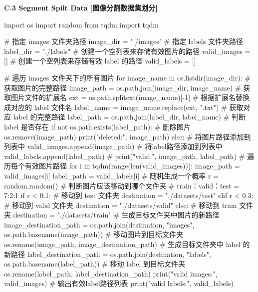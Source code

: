 \documentclass{MathorCupmodeling}
\begin{document}
\textbf{C.3 Segment Spilt Data [图像分割数据集划分]}
\begin{python}
import os
import random
from tqdm import tqdm

# 指定 images 文件夹路径
image_dir = "./images"
# 指定 labels 文件夹路径
label_dir = "./labels"
# 创建一个空列表来存储有效图片的路径
valid_images = []
# 创建一个空列表来存储有效 label 的路径
valid_labels = []

# 遍历 images 文件夹下的所有图片
for image_name in os.listdir(image_dir):
    # 获取图片的完整路径
    image_path = os.path.join(image_dir, image_name)
    # 获取图片文件的扩展名
    ext = os.path.splitext(image_name)[-1]
    # 根据扩展名替换成对应的 label 文件名
    label_name = image_name.replace(ext, ".txt")
    # 获取对应 label 的完整路径
    label_path = os.path.join(label_dir, label_name)
    # 判断 label 是否存在
    if not os.path.exists(label_path):
        # 删除图片
        os.remove(image_path)
        print("deleted:", image_path)
    else:
        # 将图片路径添加到列表中
        valid_images.append(image_path)
        # 将label路径添加到列表中
        valid_labels.append(label_path)
        # print("valid:", image_path, label_path)
# 遍历每个有效图片路径
for i in tqdm(range(len(valid_images))):
    image_path = valid_images[i]
    label_path = valid_labels[i]
    # 随机生成一个概率
    r = random.random()
    # 判断图片应该移动到哪个文件夹
    # train：valid：test = 7:2:1
    if r < 0.1:
        # 移动到 test 文件夹
        destination = "./datasets/test"
    elif r < 0.3:
        # 移动到 valid 文件夹
        destination = "./datasets/valid"
    else:
        # 移动到 train 文件夹
        destination = "./datasets/train"
    # 生成目标文件夹中图片的新路径
    image_destination_path = os.path.join(destination, "images", os.path.basename(image_path))
    # 移动图片到目标文件夹
    os.rename(image_path, image_destination_path)
    # 生成目标文件夹中 label 的新路径
    label_destination_path = os.path.join(destination, "labels", os.path.basename(label_path))
    # 移动 label 到目标文件夹
    os.rename(label_path, label_destination_path)
print("valid images:", valid_images)
# 输出有效label路径列表
print("valid labels:", valid_labels)
\end{python}
\end{document}
